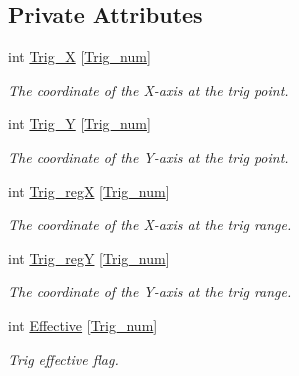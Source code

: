 \subsection*{Private Attributes}
\begin{DoxyCompactItemize}
\item 
int \hyperlink{group___the_ga0cfdf469ae302c1ee567a95e76278e34}{Trig\+\_\+X} \mbox{[}\hyperlink{group___the_ga3572c6451d34aaf557cfb88ee365cf16}{Trig\+\_\+num}\mbox{]}
\begin{DoxyCompactList}\small\item\em The coordinate of the X-\/axis at the trig point. \end{DoxyCompactList}\item 
int \hyperlink{group___the_gae6037d203c4f05f5c74b1b99f1cb3525}{Trig\+\_\+Y} \mbox{[}\hyperlink{group___the_ga3572c6451d34aaf557cfb88ee365cf16}{Trig\+\_\+num}\mbox{]}
\begin{DoxyCompactList}\small\item\em The coordinate of the Y-\/axis at the trig point. \end{DoxyCompactList}\item 
int \hyperlink{group___the_ga526db8f9c8606f55d08698cbf664dbc5}{Trig\+\_\+regX} \mbox{[}\hyperlink{group___the_ga3572c6451d34aaf557cfb88ee365cf16}{Trig\+\_\+num}\mbox{]}
\begin{DoxyCompactList}\small\item\em The coordinate of the X-\/axis at the trig range. \end{DoxyCompactList}\item 
int \hyperlink{group___the_gac305426389277260c7adecf3a23172d6}{Trig\+\_\+regY} \mbox{[}\hyperlink{group___the_ga3572c6451d34aaf557cfb88ee365cf16}{Trig\+\_\+num}\mbox{]}
\begin{DoxyCompactList}\small\item\em The coordinate of the Y-\/axis at the trig range. \end{DoxyCompactList}\item 
\mbox{\label{class_mywebcam_1_1webcam_aea3bd854e4fa05d5a49aa7ea73422672}} 
int \hyperlink{class_mywebcam_1_1webcam_aea3bd854e4fa05d5a49aa7ea73422672}{Effective} \mbox{[}\hyperlink{group___the_ga3572c6451d34aaf557cfb88ee365cf16}{Trig\+\_\+num}\mbox{]}
\begin{DoxyCompactList}\small\item\em Trig effective flag. \end{DoxyCompactList}\item 

\end{DoxyCompactItemize}
